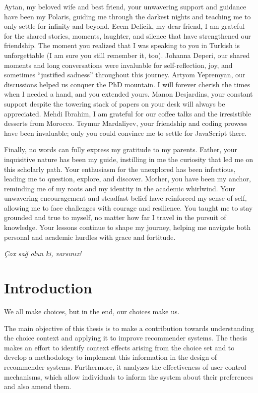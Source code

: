 \documentclass[a4paper,12pt]{article}
\begin{document}
Aytan, my beloved wife and best friend, your unwavering support and guidance have been my Polaris, guiding me through the darkest nights and teaching me to only settle for infinity and beyond. Ecem Delicik, my dear friend, I am grateful for the shared stories, moments, laughter, and silence that have strengthened our friendship. The moment you realized that I was speaking to you in Turkish is unforgettable (I am sure you still remember it, too). Johanna Deperi, our shared moments and long conversations were invaluable for self-reflection, joy, and sometimes ``justified sadness'' throughout this journey. Artyom Yepremyan, our discussions helped us conquer the PhD mountain. I will forever cherish the times when I needed a hand, and you extended yours. Manon Desjardins, your constant support despite the towering stack of papers on your desk will always be appreciated. Mehdi Ibrahim, I am grateful for our coffee talks and the irresistible desserts from Morocco. Teymur Mardaliyev, your friendship and coding prowess have been invaluable; only you could convince me to settle for JavaScript there.

Finally, no words can fully express my gratitude to my parents. Father, your inquisitive nature has been my guide, instilling in me the curiosity that led me on this scholarly path. Your enthusiasm for the unexplored has been infectious, leading me to question, explore, and discover. Mother, you have been my anchor, reminding me of my roots and my identity in the academic whirlwind. Your unwavering encouragement and steadfast belief have reinforced my sense of self, allowing me to face challenges with courage and resilience. You taught me to stay grounded and true to myself, no matter how far I travel in the pursuit of knowledge. Your lessons continue to shape my journey, helping me navigate both personal and academic hurdles with grace and fortitude. 

\textit{Çox sağ olun ki, varsınız!}



\clearpage
\tableofcontents
\newpage
\listoffigures
\clearpage
\listoftables
\newpage


\newpage
\section{Introduction}

\epigraph{We all make choices, but in the end, our choices make us.}{}


The main objective of this thesis is to make a contribution towards understanding the choice context and applying it to improve recommender systems. The thesis makes an effort to identify context effects arising from the choice set and to develop a methodology to implement this information in the design of recommender systems. Furthermore, it analyzes the effectiveness of user control mechanisms, which allow individuals to inform the system about their preferences and also amend them.
\end{document}
